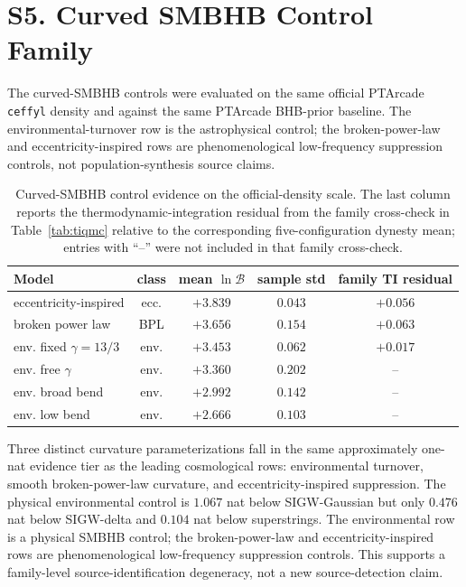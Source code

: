 \documentclass[aps,prl,superscriptaddress,nofootinbib]{revtex4-2}
\begin{document}
\section*{S5. Curved SMBHB Control Family}

The curved-SMBHB controls were evaluated on the same official PTArcade
\texttt{ceffyl} density and against the same PTArcade BHB-prior baseline.  The
environmental-turnover row is the astrophysical control; the broken-power-law
and eccentricity-inspired rows are phenomenological low-frequency suppression
controls, not population-synthesis source claims.

\begin{table}[H]
\caption{\label{tab:env}Curved-SMBHB control evidence on the official-density scale.
The last column reports the thermodynamic-integration residual from the family
cross-check in Table~\ref{tab:tiqmc} relative to the corresponding
five-configuration dynesty mean; entries with ``--'' were not included in that
family cross-check.}
\begin{ruledtabular}
\begin{tabular}{lcccc}
Model & class & mean $\ln\mathcal{B}$ & sample std & family TI residual \\
\hline
eccentricity-inspired & ecc. & $+3.839$ & $0.043$ & $+0.056$ \\
broken power law & BPL & $+3.656$ & $0.154$ & $+0.063$ \\
env. fixed $\gamma=13/3$ & env. & $+3.453$ & $0.062$ & $+0.017$ \\
env. free $\gamma$ & env. & $+3.360$ & $0.202$ & -- \\
env. broad bend & env. & $+2.992$ & $0.142$ & -- \\
env. low bend & env. & $+2.666$ & $0.103$ & -- \\
\end{tabular}
\end{ruledtabular}
\end{table}

Three distinct curvature parameterizations fall in the same approximately
one-nat evidence tier as the leading cosmological rows: environmental
turnover, smooth broken-power-law curvature, and eccentricity-inspired
suppression.  The physical environmental control is $1.067$ nat below
SIGW-Gaussian but only $0.476$ nat below SIGW-delta and $0.104$ nat below
superstrings.  The environmental row is a physical SMBHB control; the
broken-power-law and eccentricity-inspired rows are phenomenological
low-frequency suppression controls.  This supports a family-level
source-identification degeneracy, not a new source-detection claim.
\end{document}
